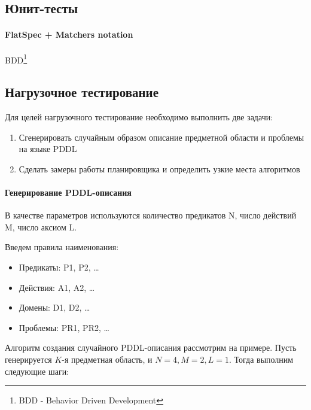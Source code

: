 \subsection{Юнит-тесты}

\paragraph{FlatSpec + Matchers notation}

BDD\footnote{BDD - Behavior Driven Development}

\subsection{Нагрузочное тестирование}
\label{subsec:highload}

Для целей нагрузочного тестирование необходимо выполнить две задачи:

\begin{enumerate}
\item
  Сгенерировать случайным образом описание предметной области и проблемы
  на языке PDDL
\item
  Сделать замеры работы планировщика и определить узкие места алгоритмов
\end{enumerate}

\paragraph{Генерирование PDDL-описания}

В качестве параметров используются количество предикатов N, число
действий M, число аксиом L.

Введем правила наименования:

\begin{itemize}
\item
  Предикаты: P1, P2, \ldots{}
\item
  Действия: A1, A2, \ldots{}
\item
  Домены: D1, D2, \ldots{}
\item
  Проблемы: PR1, PR2, \ldots{}
\end{itemize}

Алгоритм создания случайного PDDL-описания рассмотрим на примере. Пусть
генерируется $K$-я предметная область, и $N=4, M = 2, L = 1$. Тогда
выполним следующие шаги:

